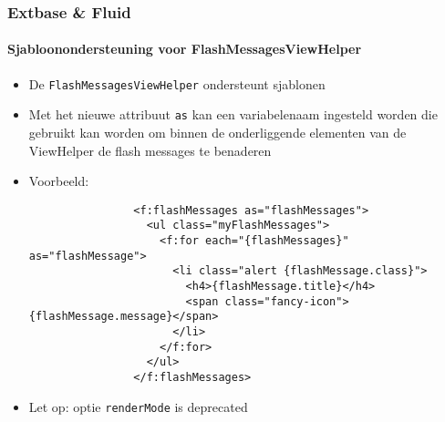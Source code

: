 \begin{frame}[fragile]
	\frametitle{Extbase \& Fluid}
	\framesubtitle{Sjabloonondersteuning voor FlashMessagesViewHelper}

	\lstset{basicstyle=\tiny\ttfamily}

	\begin{itemize}

		\item De \texttt{FlashMessagesViewHelper} ondersteunt sjablonen

		\item Met het nieuwe attribuut \texttt{as} kan een variabelenaam ingesteld worden die gebruikt kan worden
			om binnen de onderliggende elementen van de ViewHelper de flash messages te benaderen

		\item Voorbeeld:

			\begin{lstlisting}
				<f:flashMessages as="flashMessages">
				  <ul class="myFlashMessages">
				    <f:for each="{flashMessages}" as="flashMessage">
				      <li class="alert {flashMessage.class}">
				        <h4>{flashMessage.title}</h4>
				        <span class="fancy-icon">{flashMessage.message}</span>
				      </li>
				    </f:for>
				  </ul>
				</f:flashMessages>
			\end{lstlisting}

		\item Let op: optie \texttt{renderMode} is deprecated

	\end{itemize}

\end{frame}


